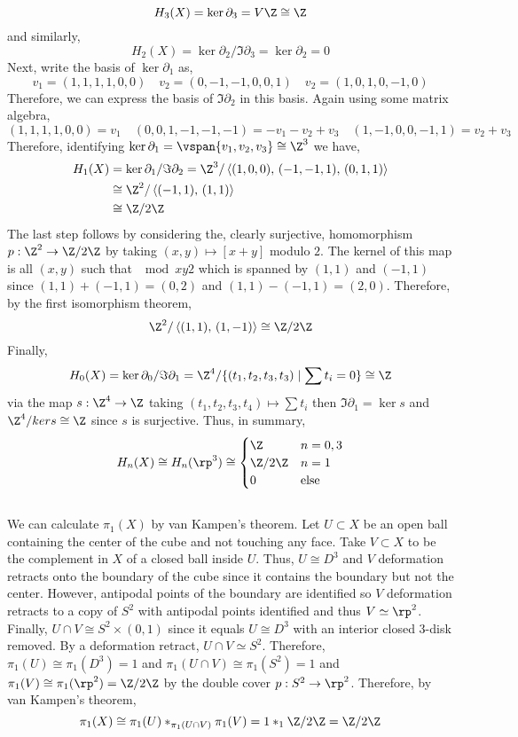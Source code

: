 \documentclass[12pt]{extarticle}
\begin{document}
\[ H_3(X) = \ker{\partial_3} = V \Z \cong \Z \]
and similarly,
\[ H_2(X) = \ker{\partial_2} / \Im{\partial_3} = \ker{\partial_2} = 0 \] 
Next, write the basis of $\ker{\partial_1}$ as,
\[ v_1 = (1,1,1,1, 0, 0) \quad v_2 = (0,-1,-1,0,0,1) \quad v_2 = (1,0,1,0,-1,0) \]
Therefore, we can express the basis of $\Im{\partial_2}$ in this basis. Again using some matrix algebra,
\[ (1,1,1,1,0,0) = v_1 \quad (0,0,1,-1,-1,-1) = -v_1 - v_2 + v_3 \quad (1, -1 , 0, 0, -1, 1) = v_2 + v_3 \] 
Therefore, identifying $\ker{\partial_1} = \vspan{v_1, v_2, v_3} \cong \Z^3$ we have,
\begin{align*} 
H_1(X) & = \ker{\partial_1} / \Im{\partial_2} = \Z^3 / \left< (1, 0, 0), \, (-1,-1,1), \, (0,1,1) \right>
\\
& \cong \Z^2 / \left< (-1,1), \, (1,1) \right>
\\
&  \cong \Z / 2 \Z 
\end{align*}
The last step follows by considering the, clearly surjective, homomorphism $p : \Z^2 \to \Z / 2 \Z$ by taking $(x,y) \mapsto [x + y]$ modulo $2$. The kernel of this map is all $(x, y)$ such that $\mod{x}{y}{2}$ which is spanned by $(1,1)$ and $(-1,1)$ since $(1,1) + (-1,1) = (0,2)$ and $(1,1) - (-1,1) = (2,0)$. Therefore, by the first isomorphism theorem, 
\[ \Z^2 / \left< (1, 1), \, (1, -1) \right> \cong \Z / 2 \Z\]
Finally, 
\[ H_0(X) = \ker{\partial_0} / \Im{\partial_1} = \Z^4 / \{(t_1, t_2, t_3, t_3) \mid \sum t_i = 0 \} \cong \Z \] 
via the map $s : \Z^4 \to \Z$ taking $(t_1, t_2, t_3, t_4) \mapsto \sum t_i$ then $\Im{\partial_1} = \ker{s}$ and $\Z^4 / ker{s} \cong \Z$ since $s$ is surjective. Thus, in summary,
\[ H_n(X) \cong H_n(\rp^3) \cong 
\begin{cases}
\Z & n = 0,3 
\\
\Z / 2 \Z & n = 1 
\\
0 & \text{else}
\end{cases}\] 
\bigskip\\
We can calculate $\pi_1(X)$ by van Kampen's theorem. Let $U \subset X$ be an open ball containing the center of the cube and not touching any face. Take $V \subset X$ to be the complement in $X$ of a closed ball inside $U$. Thus, $U \cong D^3$ and $V$ deformation retracts onto the boundary of the cube since it contains the boundary but not the center. However, antipodal points of the boundary are identified so $V$ deformation retracts to a copy of $S^2$ with antipodal points identified and thus $V \simeq \rp^2$. Finally, $U \cap V \cong S^2 \times (0, 1)$ since it equals $U \cong D^3$ with an interior closed 3-disk removed. By a deformation retract, $U \cap V \simeq S^2$. Therefore, $\pi_1(U) \cong \pi_1(D^3) = 1$ and $\pi_1(U \cap V) \cong \pi_1(S^2) = 1$ and $\pi_1(V) \cong \pi_1(\rp^2) = \Z / 2 \Z$ by the double cover $p : S^2 \to \rp^2$. Therefore, by van Kampen's theorem,
\[ \pi_1(X) \cong \pi_1(U) *_{\pi_1(U \cap V)} \pi_1(V) = 1 *_{1} \Z / 2 \Z = \Z / 2 \Z \]      
\end{document}
